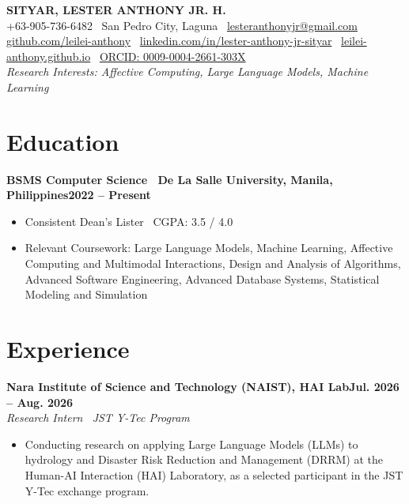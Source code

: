 \documentclass[10.5pt, letterpaper]{article}
\newcommand{\entry}[3]{%
    \par\noindent
    {\textbf{#1}\hfill\textbf{#2}}\\
    {\textit{#3}}\par\vspace{0.05em}
}
\begin{document}
\begin{center}
    {\Large \textbf{SITYAR, LESTER ANTHONY JR. H.}}\\[0.35em]
    {\small
        +63-905-736-6482 \textbullet\ San Pedro City, Laguna \textbullet\ \href{mailto:lesteranthonyjr@gmail.com}{lesteranthonyjr@gmail.com}
    }\\[0.15em]
    {\small
        \href{https://github.com/leilei-anthony}{github.com/leilei-anthony} \textbullet\
        \href{https://linkedin.com/in/lester-anthony-jr-sityar}{linkedin.com/in/lester-anthony-jr-sityar} \textbullet\
        \href{https://leilei-anthony.github.io}{leilei-anthony.github.io} \textbullet\
        \href{https://orcid.org/0009-0004-2661-303X}{ORCID: 0009-0004-2661-303X}
    }\\[0.15em]
    {\small \textit{Research Interests: Affective Computing, Large Language Models, Machine Learning}}
\end{center}

\section{Education}

\entry{BSMS Computer Science \textbar\ De La Salle University, Manila, Philippines}{2022 -- Present}{}
\begin{itemize}
    \item Consistent Dean's Lister \textbar\ CGPA: 3.5 / 4.0
    \item Relevant Coursework: Large Language Models, Machine Learning, Affective Computing and Multimodal Interactions, Design and Analysis of Algorithms, Advanced Software Engineering, Advanced Database Systems, Statistical Modeling and Simulation
\end{itemize}

\section{Experience}

\entry{Nara Institute of Science and Technology (NAIST), HAI Lab}{Jul. 2026 -- Aug. 2026}{Research Intern \textbar\ JST Y-Tec Program}
\begin{itemize}
    \item Conducting research on applying Large Language Models (LLMs) to hydrology and Disaster Risk Reduction and Management (DRRM) at the Human-AI Interaction (HAI) Laboratory, as a selected participant in the JST Y-Tec exchange program.
\end{itemize}
\end{document}
